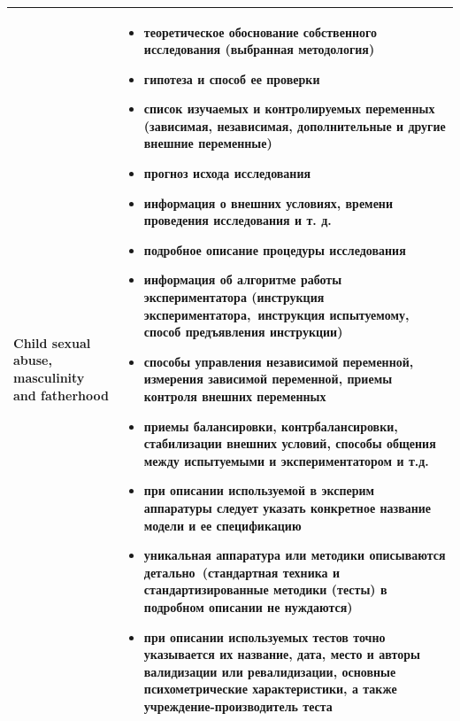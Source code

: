 \documentclass{../../common/thesisbyxetex}
\begin{document}
\begin{longtable}[t]{|P{0.25\textwidth}|P{0.65\textwidth}|}
Child sexual abuse, masculinity and fatherhood &
\begin{itemize}
\item теоретическое обоснование собственного исследования (выбранная методология)
\item гипотеза и способ ее проверки
\item список изучаемых и контролируемых переменных (зависимая, независимая, дополнительные и другие внешние переменные)
\item прогноз исхода исследования
\item информация о внешних условиях, времени проведения исследования и т. д.
\item подробное описание процедуры исследования
\item информация об алгоритме работы экспериментатора (инструкция экспериментатора, инструкция испытуемому, способ
предъявления инструкции)
\item способы управления независимой переменной, измерения зависимой переменной, приемы контроля внешних переменных
\item приемы балансировки, контрбалансировки, стабилизации внешних условий, способы общения между испытуемыми и
экспериментатором и т.д.
\item при описании используемой в эксперим аппаратуры следует указать конкретное название модели и ее спецификацию
\item уникальная аппаратура или методики описываются детально (стандартная техника и стандартизированные методики
(тесты) в подробном описании не нуждаются)
\item при описании используемых тестов точно указывается их название, дата, место и авторы валидизации или
ревалидизации, основные психометрические характеристики, а также учреждение-производитель теста

\end{itemize}
\\ \hline


\end{longtable}
\end{document}
